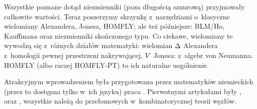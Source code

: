 
Wszystkie poznane dotąd niezmienniki (poza długością sznurową) przyjmowały całkowite wartości.
Teraz poszerzymy skrzynkę z~narzędziami o~klasyczne wielomiany Alexandera, Jonesa, HOMFLY; ale też późniejsze: BLM/Ho, Kauffmana oraz niezmienniki skończonego typu.
Co ciekawe, wielomiany te wywodzą się z~różnych działów matematyki: wielomian $\Delta$ Alexandera z~homologii pewnej przestrzeni nakrywającej, $V$ Jonesa: z~algebr von Neumanna.
HOMFLY (albo raczej HOMFLY-PT) to ich naturalne uogólnienie.

Atrakcyjnym wprowadzeniem była przygotowana przez matematyków niemieckich (przez to dostępna tylko w~ich języku) praca \cite{gellert09}.
Pierwotnymi artykułami były \cite{alexander28}, \cite{jones85} oraz \cite{homfly85}, wszystkie należą do przełomowych w~kombinatorycznej teorii węzłów.


